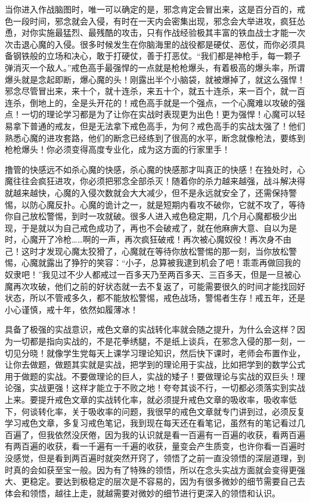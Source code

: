当你进入作战脑图时，唯一可以确定的是，邪念肯定会冒出来，这是百分百的，戒色一段时间，邪念就会入侵，有时在一天内会密集出现，邪念会大举进攻，疯狂怂恿，对你实施最猛烈、最残酷的攻击，只有作战经验极其丰富的铁血战士才能一次次击退心魔的入侵。很多时候发生在你脑海里的战役都是硬仗、恶仗，而你必须具备钢铁般的立场和决心，敢于打硬仗，善于打恶仗。“我们都是神枪手，每一颗子弹消灭一个敌人。”戒色高手最强悍的一点就是枪枪爆头，有着极高的爆头率，所谓爆头就是念起即断，爆心魔的头！刚露出半个小脑袋，就被爆掉了，就这么强悍！邪念尽管冒出来，来十个，就十连杀，来五十个，就五十连杀，来一百个，就一百连杀，倒地上的，全是头开花的！戒色高手就是一个强点，一个心魔难以攻破的强点！一切的理论学习都是为了让你在实战时表现更为出色！更为强悍！心魔可以轻易拿下普通的戒友，但是无法拿下戒色高手，为何？戒色高手的实战太强了！他们熟悉心魔的进攻套路，他们的断念已经练到了很高的水平，断念就像枪法，要练到枪枪爆头！你必须变得高度专业化，成为这方面的行家里手！

撸管的快感远不如杀心魔的快感，杀心魔的快感那才叫真正的快感！在独处时，心魔往往会疯狂进攻，你必须把邪念全部杀灭！随着你的杀力越来越强，战斗解决得就越来越快，心魔的入侵次数就会大大减少，但不是永远就安全了，还需保持警惕，以防心魔反扑。心魔的诡计之一，就是短期内看攻不破你，它就不攻了，等待你自己放松警惕，到时一攻就破。很多人进入戒色稳定期，几个月心魔都极少出现，于是就以为自己戒色成功了，再也不会破戒了，就在他麻痹大意、自以为是时，心魔开了冷枪……啊的一声，再次疯狂破戒！再次被心魔奴役！再次身不由己！这时才发现心魔太狡猾了，心魔就在等待你放松警惕的那一刻，当你放松警惕，心魔就露出了狰狞的笑容：“小子，总算被我逮到机会了吧！乖乖再做回我的奴隶吧！”我见过不少人都戒过一百多天乃至两百多天、三百多天，但是一旦被心魔再次攻破，他们之前的好状态就一去不复返了，可能需要很久的时间才能找回好状态，所以不管戒多久，都不能放松警惕，戒色战场，警惕者生存！戒五年，还是小心谨慎，戒十年，依然如履薄冰！

具备了极强的实战意识，戒色文章的实战转化率就会随之提升，为什么会这样？因为一切都是指向实战的，不是花拳绣腿，不是纸上谈兵，在邪念入侵的那一刻，一切见分晓！就像学生党每天上课学习理论知识，然后快下课时，老师会布置作业，让你去做题，做题其实就是实战，把学到的理论用于实战，比如把学到的数学公式用于做题的实战。不要做理论的巨人，实战的矮子！要做理论与实战的双巨头！理论强，实战更强！这样才能立于不败之地！夸夸其谈不行，一切都必须落实到实战上来。要提升戒色文章的实战转化率，就必须提升戒色文章的吸收率，吸收率低下，何谈转化率，关于吸收率的问题，我很早的戒色文章就专门讲到过，必须反复学习戒色文章，多复习戒色笔记，我到现在每天还在看笔记，虽然有的笔记看过几百遍了，但我依然没厌倦，因为我的认识就是看一百遍有一百遍的收获，看两百遍有两百遍的收获，看一千遍有一千遍的收获，量变会产生质变，也许你看一百遍时没感觉，但是看到两百遍时就突然开窍了，领悟了之前一直没领悟的深层道理，到时真的会如获至宝一般。因为有了特殊的领悟，所以在念头实战方面就会变得更强大、更稳定。要达到极稳定的层次是不容易的，因为有很多微妙的细节需要自己去体会和领悟，越往上走，就越需要对微妙的细节进行更深入的领悟和认识。

